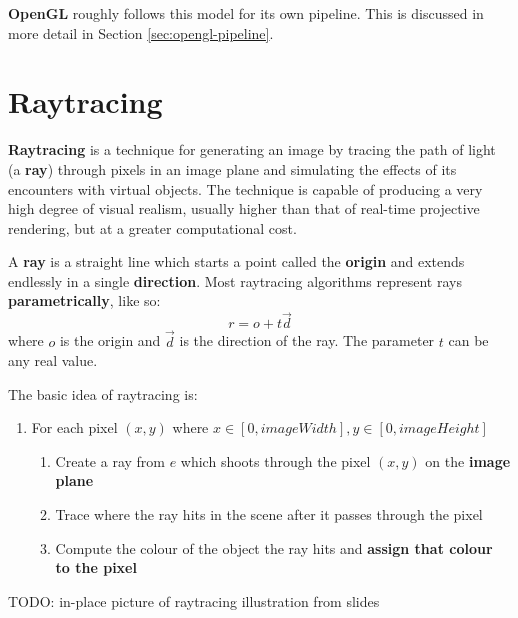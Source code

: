\documentclass{article}
\begin{document}
\textbf{OpenGL} roughly follows this model for its own pipeline. This is discussed in more detail in Section \ref{sec:opengl-pipeline}.

\section{Raytracing}

\textbf{Raytracing} is a technique for generating an image by tracing the path of light (a \textbf{ray}) through pixels in an image plane and simulating the effects of its encounters with virtual objects. The technique is capable of producing a very high degree of visual realism, usually higher than that of real-time projective rendering, but at a greater computational cost.

A \textbf{ray} is a straight line which starts a point called the \textbf{origin} and extends endlessly in a single \textbf{direction}. Most raytracing algorithms represent rays \textbf{parametrically}, like so:
\begin{equation}
	r = o + t\vec{d}
	\label{eq:parametric-ray}
\end{equation}
where $o$ is the origin and $\vec{d}$ is the direction of the ray. The parameter $t$ can be any real value.

The basic idea of raytracing is:
\begin{enumerate}
	\item For each pixel $(x, y)$ where $x \in [0, imageWidth], y \in [0, imageHeight]$
	\begin{enumerate}
		\item Create a ray from $e$ which shoots through the pixel $(x, y)$ on the \textbf{image plane}
		\item Trace where the ray hits in the scene after it passes through the pixel
		\item Compute the colour of the object the ray hits and \textbf{assign that colour to the pixel}
	\end{enumerate}
\end{enumerate}

TODO: in-place picture of raytracing illustration from slides
\end{document}
